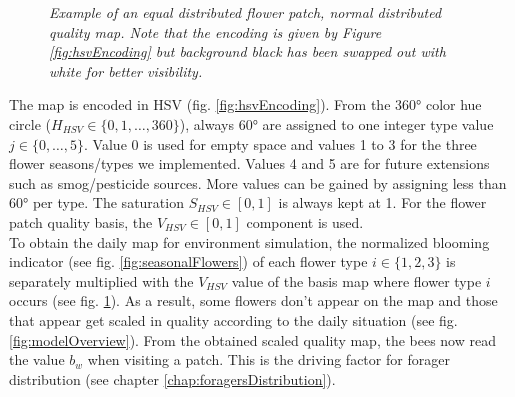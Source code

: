	\begin{figure}
		\centering
		\caption{\textit{Example of an equal distributed flower patch, normal distributed quality map. Note that the encoding is given by Figure \ref{fig:hsvEncoding} but background black has been swapped out with white for better visibility.}}
		\label{fig:normeqMap}
	\end{figure}
	
	The map is encoded in HSV (fig. \ref{fig:hsvEncoding}). From the 360° color hue circle ($H_{HSV} \in \{0,1,\ldots,360\}$), always 60° are assigned to one integer type value $j \in \{0,\ldots,5\}$. Value 0 is used for empty space and values 1 to 3 for the three flower seasons/types we implemented. Values 4 and 5 are for future extensions such as smog/pesticide sources. More values can be gained by assigning less than 60° per type. The saturation $S_{HSV} \in [0,1]$ is always kept at 1. For the flower patch quality basis, the $V_{HSV} \in [0,1]$ component is used.\\
	
	To obtain the daily map for environment simulation, the normalized blooming indicator (see fig. \ref{fig:seasonalFlowers}) of each flower type $i \in \{1,2,3\}$ is separately multiplied with the $V_{HSV}$ value of the basis map where flower type $i$ occurs (see fig. \ref{fig:normeqMap}). As a result, some flowers don't appear on the map and those that appear get scaled in quality according to the daily situation (see fig. \ref{fig:modelOverview}). From the obtained scaled quality map, the bees now read the value $b_w$ when visiting a patch. This is the driving factor for forager distribution (see chapter \ref{chap:foragersDistribution}).
	
